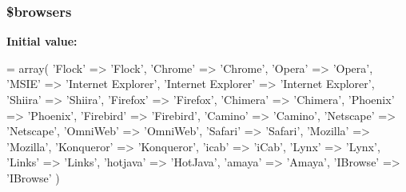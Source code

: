 \subsubsection[{\$browsers}]{\setlength{\rightskip}{0pt plus 5cm}\$browsers}\label{user__agents_8php_a81edf933083b5ac5b380385f59074a7d}
{\bfseries Initial value\-:}
\begin{DoxyCode}
= array(
                    \textcolor{stringliteral}{'Flock'}             => \textcolor{stringliteral}{'Flock'},
                    \textcolor{stringliteral}{'Chrome'}            => \textcolor{stringliteral}{'Chrome'},
                    \textcolor{stringliteral}{'Opera'}             => \textcolor{stringliteral}{'Opera'},
                    \textcolor{stringliteral}{'MSIE'}              => \textcolor{stringliteral}{'Internet Explorer'},
                    \textcolor{stringliteral}{'Internet Explorer'} => \textcolor{stringliteral}{'Internet Explorer'},
                    \textcolor{stringliteral}{'Shiira'}            => \textcolor{stringliteral}{'Shiira'},
                    \textcolor{stringliteral}{'Firefox'}           => \textcolor{stringliteral}{'Firefox'},
                    \textcolor{stringliteral}{'Chimera'}           => \textcolor{stringliteral}{'Chimera'},
                    \textcolor{stringliteral}{'Phoenix'}           => \textcolor{stringliteral}{'Phoenix'},
                    \textcolor{stringliteral}{'Firebird'}          => \textcolor{stringliteral}{'Firebird'},
                    \textcolor{stringliteral}{'Camino'}            => \textcolor{stringliteral}{'Camino'},
                    \textcolor{stringliteral}{'Netscape'}          => \textcolor{stringliteral}{'Netscape'},
                    \textcolor{stringliteral}{'OmniWeb'}           => \textcolor{stringliteral}{'OmniWeb'},
                    \textcolor{stringliteral}{'Safari'}            => \textcolor{stringliteral}{'Safari'},
                    \textcolor{stringliteral}{'Mozilla'}           => \textcolor{stringliteral}{'Mozilla'},
                    \textcolor{stringliteral}{'Konqueror'}         => \textcolor{stringliteral}{'Konqueror'},
                    \textcolor{stringliteral}{'icab'}              => \textcolor{stringliteral}{'iCab'},
                    \textcolor{stringliteral}{'Lynx'}              => \textcolor{stringliteral}{'Lynx'},
                    \textcolor{stringliteral}{'Links'}             => \textcolor{stringliteral}{'Links'},
                    \textcolor{stringliteral}{'hotjava'}           => \textcolor{stringliteral}{'HotJava'},
                    \textcolor{stringliteral}{'amaya'}             => \textcolor{stringliteral}{'Amaya'},
                    \textcolor{stringliteral}{'IBrowse'}           => \textcolor{stringliteral}{'IBrowse'}
                )
\end{DoxyCode}



